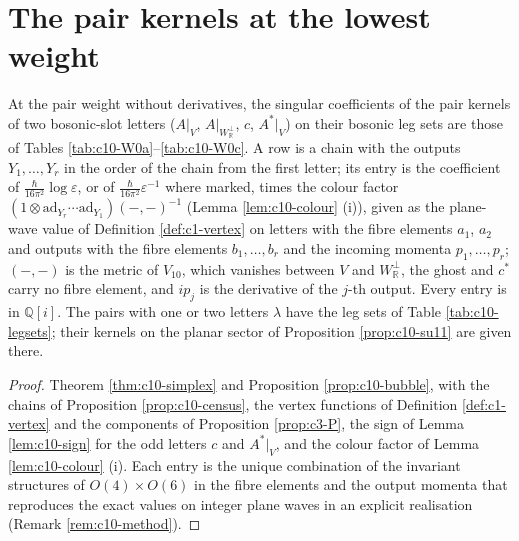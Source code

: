 \section{The pair kernels at the lowest weight}

\begin{proposition}
\label{prop:c10-W0}
At the pair weight without derivatives, the singular coefficients of the pair kernels of two bosonic-slot letters ($A|_V$, $A|_{W_{\mathbb R}^\perp}$, $c$, $A^*|_V$) on their bosonic leg sets are those of Tables \ref{tab:c10-W0a}--\ref{tab:c10-W0c}. A row is a chain with the outputs $Y_1,\dots,Y_r$ in the order of the chain from the first letter; its entry is the coefficient of $\frac{\hbar}{16\pi^2}\log\varepsilon$, or of $\frac{\hbar}{16\pi^2}\varepsilon^{-1}$ where marked, times the colour factor $(1\otimes\mathrm{ad}_{Y_r}\cdots\mathrm{ad}_{Y_1})(-,-)^{-1}$ (Lemma \ref{lem:c10-colour} (i)), given as the plane-wave value of Definition \ref{def:c1-vertex} on letters with the fibre elements $a_1$, $a_2$ and outputs with the fibre elements $b_1,\dots,b_r$ and the incoming momenta $p_1,\dots,p_r$; $(-,-)$ is the metric of $V_{10}$, which vanishes between $V$ and $W_{\mathbb R}^\perp$, the ghost and $c^*$ carry no fibre element, and $ip_j$ is the derivative of the $j$-th output. Every entry is in $\mathbb Q[i]$. The pairs with one or two letters $\lambda$ have the leg sets of Table \ref{tab:c10-legsets}; their kernels on the planar sector of Proposition \ref{prop:c10-su11} are given there.
\end{proposition}

\begin{proof}
Theorem \ref{thm:c10-simplex} and Proposition \ref{prop:c10-bubble}, with the chains of Proposition \ref{prop:c10-census}, the vertex functions of Definition \ref{def:c1-vertex} and the components of Proposition \ref{prop:c3-P}, the sign of Lemma \ref{lem:c10-sign} for the odd letters $c$ and $A^*|_V$, and the colour factor of Lemma \ref{lem:c10-colour} (i). Each entry is the unique combination of the invariant structures of $O(4)\times O(6)$ in the fibre elements and the output momenta that reproduces the exact values on integer plane waves in an explicit realisation (Remark \ref{rem:c10-method}).
\end{proof}

